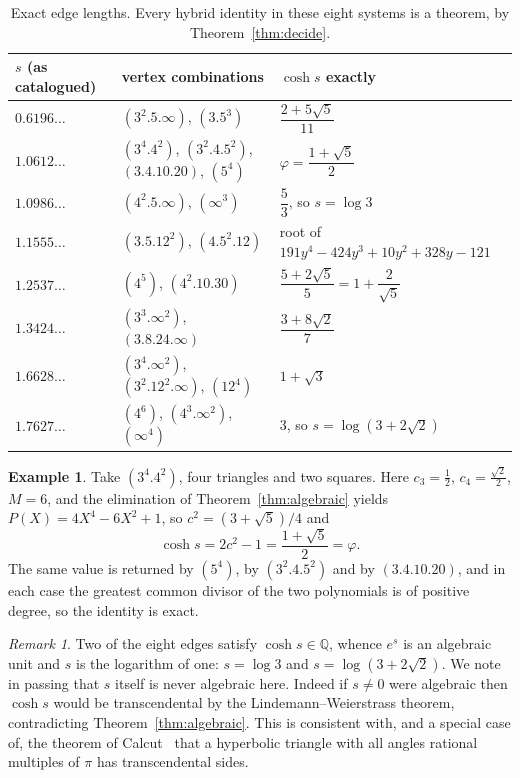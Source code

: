 \documentclass[11pt,a4paper]{article}
\theoremstyle{plain}
\theoremstyle{definition}
\newtheorem{example}[theorem]{Example}
\theoremstyle{remark}
\newtheorem{remark}[theorem]{Remark}
\newcommand{\QQ}{\mathbb{Q}}
\newcommand{\vc}[1]{(#1)}
\begin{document}
\begin{table}[t]
\centering
\begin{tabular}{@{}lll@{}}
\toprule
$s$ (as catalogued) & vertex combinations & $\cosh s$ exactly \\
\midrule
$0.6196\dots$ & $\vc{3^{2}.5.\infty}$, $\vc{3.5^{3}}$
  & $\dfrac{2+5\sqrt5}{11}$ \\[2mm]
$1.0612\dots$ & $\vc{3^{4}.4^{2}}$, $\vc{3^{2}.4.5^{2}}$, $\vc{3.4.10.20}$, $\vc{5^{4}}$
  & $\varphi=\dfrac{1+\sqrt5}{2}$ \\[2mm]
$1.0986\dots$ & $\vc{4^{2}.5.\infty}$, $\vc{\infty^{3}}$
  & $\dfrac53$, \; so $s=\log 3$ \\[2mm]
$1.1555\dots$ & $\vc{3.5.12^{2}}$, $\vc{4.5^{2}.12}$
  & root of $191y^{4}-424y^{3}+10y^{2}+328y-121$ \\[2mm]
$1.2537\dots$ & $\vc{4^{5}}$, $\vc{4^{2}.10.30}$
  & $\dfrac{5+2\sqrt5}{5}=1+\dfrac{2}{\sqrt5}$ \\[2mm]
$1.3424\dots$ & $\vc{3^{3}.\infty^{2}}$, $\vc{3.8.24.\infty}$
  & $\dfrac{3+8\sqrt2}{7}$ \\[2mm]
$1.6628\dots$ & $\vc{3^{4}.\infty^{2}}$, $\vc{3^{2}.12^{2}.\infty}$, $\vc{12^{4}}$
  & $1+\sqrt3$ \\[2mm]
$1.7627\dots$ & $\vc{4^{6}}$, $\vc{4^{3}.\infty^{2}}$, $\vc{\infty^{4}}$
  & $3$, \; so $s=\log(3+2\sqrt2)$ \\
\bottomrule
\end{tabular}
\caption{Exact edge lengths. Every hybrid identity in these eight systems is a
theorem, by Theorem~\ref{thm:decide}.}
\label{tab:edges}
\end{table}

\begin{example}
Take $\vc{3^{4}.4^{2}}$, four triangles and two squares. Here
$c_3=\tfrac12$, $c_4=\tfrac{\sqrt2}{2}$, $M=6$, and the elimination of
Theorem~\ref{thm:algebraic} yields $P(X)=4X^{4}-6X^{2}+1$, so
$c^{2}=(3+\sqrt5)/4$ and
\[
  \cosh s=2c^{2}-1=\frac{1+\sqrt5}{2}=\varphi .
\]
The same value is returned by $\vc{5^{4}}$, by $\vc{3^{2}.4.5^{2}}$ and by
$\vc{3.4.10.20}$, and in each case the greatest common divisor of the two
polynomials is of positive degree, so the identity is exact.
\end{example}

\begin{remark}
Two of the eight edges satisfy $\cosh s\in\QQ$, whence $e^{s}$ is an algebraic
unit and $s$ is the logarithm of one: $s=\log3$ and $s=\log(3+2\sqrt2)$. We note
in passing that $s$ itself is never algebraic here. Indeed if $s\ne0$ were
algebraic then $\cosh s$ would be transcendental by the Lindemann--Weierstrass
theorem, contradicting Theorem~\ref{thm:algebraic}. This is consistent with, and
a special case of, the theorem of Calcut~\cite{calcutrational} that a hyperbolic
triangle with all angles rational multiples of $\pi$ has transcendental sides.
\end{remark}
\end{document}
